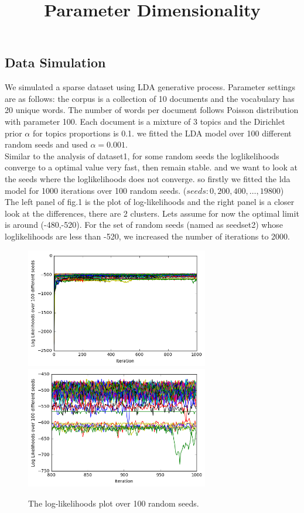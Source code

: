 \documentclass[11pt]{article}
\date{\vspace{-5ex}}
\begin{document}
\begin{spacing}{1.6}
\title{Parameter Dimensionality}
\maketitle

\section{Data Simulation}
\noindent We simulated a sparse dataset using LDA generative process. Parameter settings are as follows: the corpus is a collection of 10 documents and the vocabulary has 20 unique words. The number of words per document follows Poisson distribution with parameter 100. Each document is a mixture of 3 topics and the Dirichlet prior $\alpha$ for topics proportions is 0.1. we fitted the LDA model over 100 different random seeds and used $\alpha =0.001$.\\

\noindent Similar to the analysis of dataset1, for some random seeds the loglikelihoods converge to a optimal value very fast, then remain stable. and we want to look at the seeds where the loglikelihoods does not converge. so firstly we fitted the lda model for 1000 iterations over 100 random seeds.
($seeds:0,200,400,\ldots,19800$) The left panel of fig.1 is the plot of log-likelihoods and the right panel is a closer look at the differences, there are 2 clusters. Lets assume for now the optimal limit is around (-480,-520). For the set of random seeds (named as seedset2) whose loglikelihoods are less than -520, we increased the number of iterations to 2000.\\
\begin{minipage}{1.0\textwidth}
\begin{figure}[H]
\includegraphics[width = 80mm]{figure1.png}
\includegraphics[width = 80mm]{figure2.png}
\caption{The log-likelihoods plot over 100 random seeds.}\scriptsize
\end{figure}
\end{minipage} \\


\end{spacing}
\end{document}
